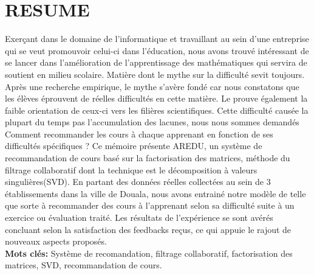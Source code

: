 \chapter*{RESUME}

	Exerçant dans le domaine de l'informatique et travaillant au sein d'une entreprise qui se veut promouvoir celui-ci dans l'éducation, nous avons trouvé intéressant de se lancer dans l'amélioration de l'apprentissage des mathématiques qui servira de soutient en milieu scolaire. Matière dont le mythe sur la difficulté sevit toujours. Après une recherche empirique, le mythe s'avère fondé car nous constatons que les élèves éprouvent de réelles difficultés en cette matière. Le prouve également la faible orientation de ceux-ci vers les filières scientifiques. Cette difficulté causée la plupart du temps pas l'accumulation des lacunes, nous nous sommes demandés Comment recommander les cours à chaque apprenant en fonction de ses difficultés spécifiques ? Ce mémoire présente AREDU, un système de recommandation de cours basé sur la factorisation des matrices, méthode du filtrage collaboratif dont la technique est le décomposition à valeurs singulières(SVD). En partant des données réelles collectées au sein de 3 établissements dans la ville de Douala, nous avons entrainé notre modèle de telle que sorte à recommander des cours à l'apprenant selon sa difficulté suite à un exercice ou évaluation traité. Les résultats de l'expérience se sont avérés concluant selon la satisfaction des feedbacks reçus, ce qui appuie le rajout de nouveaux aspects proposés. \\
	
	\textbf{Mots clés:} Système de recomandation, filtrage collaboratif, factorisation des matrices, SVD, recommandation de cours.